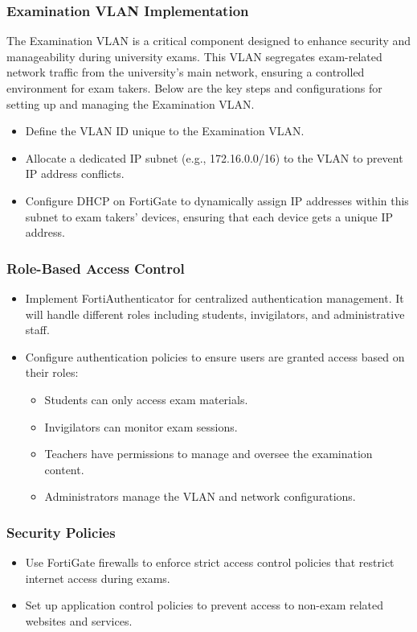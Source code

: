 \documentclass[12pt]{report}
\begin{document}
\subsubsection{Examination VLAN Implementation}
The Examination VLAN is a critical component designed to enhance security and manageability during university exams. This VLAN segregates exam-related network traffic from the university's main network, ensuring a controlled environment for exam takers. Below are the key steps and configurations for setting up and managing the Examination VLAN.
\begin{itemize}
    \item Define the VLAN ID unique to the Examination VLAN.
    \item Allocate a dedicated IP subnet (e.g., 172.16.0.0/16) to the VLAN to prevent IP address conflicts.
    \item Configure DHCP on FortiGate to dynamically assign IP addresses within this subnet to exam takers' devices, ensuring that each device gets a unique IP address.
\end{itemize}

\subsubsection{Role-Based Access Control}
\begin{itemize}
    \item Implement FortiAuthenticator for centralized authentication management. It will handle different roles including students, invigilators, and administrative staff.
    \item Configure authentication policies to ensure users are granted access based on their roles:
    \begin{itemize}
        \item Students can only access exam materials.
        \item Invigilators can monitor exam sessions.
        \item Teachers have permissions to manage and oversee the examination content.
        \item Administrators manage the VLAN and network configurations.
    \end{itemize}
\end{itemize}

\subsubsection{Security Policies}
\begin{itemize}
    \item Use FortiGate firewalls to enforce strict access control policies that restrict internet access during exams.
    \item Set up application control policies to prevent access to non-exam related websites and services.
\end{itemize}
\end{document}
